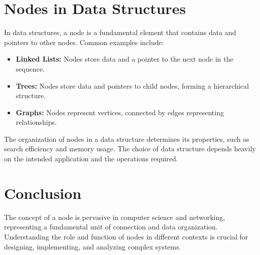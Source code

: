 \documentclass{article}
\begin{document}
\section{Nodes in Data Structures}

In data structures, a node is a fundamental element that contains data and pointers to other nodes.  Common examples include:

\begin{itemize}
    \item \textbf{Linked Lists:} Nodes store data and a pointer to the next node in the sequence.
    \item \textbf{Trees:} Nodes store data and pointers to child nodes, forming a hierarchical structure.
    \item \textbf{Graphs:} Nodes represent vertices, connected by edges representing relationships.
\end{itemize}

The organization of nodes in a data structure determines its properties, such as search efficiency and memory usage.  The choice of data structure depends heavily on the intended application and the operations required.


\section{Conclusion}

The concept of a node is pervasive in computer science and networking, representing a fundamental unit of connection and data organization. Understanding the role and function of nodes in different contexts is crucial for designing, implementing, and analyzing complex systems.
\end{document}
